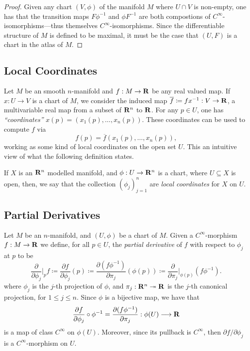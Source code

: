 \begin{proof}
Given any chart \((V, \phi)\) of the manifold \(M\) where \(U \cap V\) is
non-empty, one has that the transition maps \(F \phi^{-1}\) and \(\phi F^{-1}\)
are both compostions of \(C^{\infty}\)-isomorphisms---thus themselves
\(C^{\infty}\)-isomorphisms. Since the differentiable structure of \(M\) is
defined to be maximal, it must be the case that \((U, F)\) is a chart in the
atlas of \(M\).
\end{proof}

\subsection{Local Coordinates}

Let \(M\) be an smooth \(n\)-manifold and \(f: M \to \mathbf{R}\) be any real valued
map. If \(x: U \to V\) is a chart of \(M\), we consider the induced map
\(\overline{f} \coloneq f x^{-1}: V \to \mathbf{R}\), a multivariable real map from a
subset of \(\mathbf{R}^n\) to \(\mathbf{R}\). For any \(p \in U\), one has
\emph{``coordinates''} \(x(p) = (x_1(p), \dots, x_n(p))\). These coordinates can
be used to compute \(f\) via
\[
f(p) = \overline{f}(x_1(p), \dots, x_n(p)),
\]
working as some kind of local coordinates on the open set \(U\). This an
intuitive view of what the following definition states.

\begin{definition}
\label{def:local-coordinates}
If \(X\) is an \(\mathbf{R}^n\) modelled manifold, and \(\phi: U \to \mathbf{R}^n\) is a chart,
where \(U \subseteq X\) is open, then, we say that the collection
\((\phi_j)_{j=1}^n\) are \emph{local coordinates} for \(X\) on \(U\).
\end{definition}

\subsection{Partial Derivatives}

\begin{definition}
\label{def:partial-derivative-manifold}
Let \(M\) be an \(n\)-manifold, and \((U, \phi)\) be a chart of \(M\). Given a
\(C^{\infty}\)-morphism \(f: M \to \mathbf{R}\) we define, for all \(p \in U\), the
\emph{partial derivative} of \(f\) with respect to \(\phi_j\) at \(p\) to be
\[
\frac{\partial}{\partial \phi_j} \bigg|_p f
\coloneq \frac{\partial f}{\partial \phi_j}(p)
\coloneq \frac{\partial (f \phi^{-1})}{\partial \pi_j}(\phi(p))
\coloneq \frac{\partial}{\partial \pi_{j}} \bigg|_{\phi(p)} (f \phi^{-1}).
\]
where \(\phi_j\) is the \(j\)-th projection of \(\phi\), and
\(\pi_j: \mathbf{R}^n \twoheadrightarrow \mathbf{R}\) is the \(j\)-th canonical projection, for
\(1 \leq j \leq n\). Since \(\phi\) is a bijective map, we have that
\[
\frac{\partial f}{\partial \phi_j} \circ \phi^{-1}
= \frac{\partial (f \phi^{-1})}{\partial \pi_j}:
\phi(U) \longrightarrow \mathbf{R}
\]
is a map of class \(C^{\infty}\) on \(\phi(U)\). Moreover, since its pullback is
\(C^{\infty}\), then \(\partial f/\partial \phi_j\) is a \(C^{\infty}\)-morphism on \(U\).
\end{definition}


